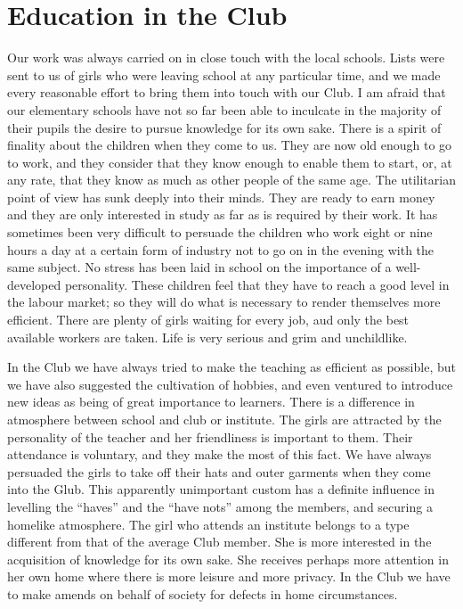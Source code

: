 \chapter{Education in the Club}

Our work was always carried on in close touch with the
local schools. Lists were sent to us of girls who were leaving
school at any particular time, and we made every
reasonable effort to bring them into touch with our Club.
I am afraid that our elementary schools have not so far
been able to inculcate in the majority of their pupils the
desire to pursue knowledge for its own sake. There is a
spirit of finality about the children when they come to
us. They are now old enough to go to work, and they
consider that they know enough to enable them to start,
or, at any rate, that they know as much as other people
of the same age. The utilitarian point of view has sunk
deeply into their minds. They are ready to earn money
and they are only interested in study as far as is required
by their work. It has sometimes been very difficult to
persuade the children who work eight or nine hours a
day at a certain form of industry not to go on in the evening
with the same subject. No stress has been laid in
school on the importance of a well-developed personality.
These children feel that they have to reach a good level
in the labour market; so they will do what is necessary to
render themselves more efficient. There are plenty of
girls waiting for every job, aud only the best available
workers are taken. Life is very serious and grim and
unchildlike.

In the Club we have always tried to make the teaching
as efficient as possible, but we have also suggested the cultivation
of hobbies, and even ventured to introduce new
ideas as being of great importance to learners. There is
a difference in atmosphere between school and club or
institute. The girls are attracted by the personality of the
teacher and her friendliness is important to them. Their
attendance is voluntary, and they make the most of this
fact. We have always persuaded the girls to take off their
hats and outer garments when they come into the Glub.
This apparently unimportant custom has a definite influence
in levelling the “haves” and the “have nots”
among the members, and securing a homelike atmosphere.
The girl who attends an institute belongs to a type
different from that of the average Club member. She is
more interested in the acquisition of knowledge for its
own sake. She receives perhaps more attention in her own
home where there is more leisure and more privacy. In
the Club we have to make amends on behalf of society
for defects in home circumstances.


